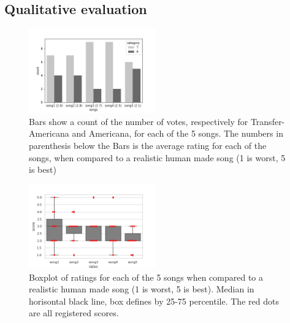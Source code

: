 \documentclass{IEEEtran}
\begin{document}
\subsection{Qualitative evaluation}

\begin{figure}
    \centering
    \includegraphics[width=0.485\textwidth]{songs_category.png}
    \caption{
        Bars show a count of the number of votes, respectively for
        Transfer-Americana and Americana, for each of the 5 songs.
        The numbers in parenthesis below the Bars is the average rating
        for each of the songs, when compared to a realistic human made
        song (1 is worst, 5 is best)
    \label{fig:songs}
    } 
\end{figure}

\begin{figure}
    \centering
    \includegraphics[width=0.485\textwidth]{scores.png}
    \caption{
        Boxplot of ratings for each of the 5 songs when compared to a realistic
        human made song (1 is worst, 5 is best). Median in horisontal black line,
        box defines by 25-75 percentile. The red dots are all registered scores.
        \label{fig:scores}
    }
\end{figure}
\end{document}
